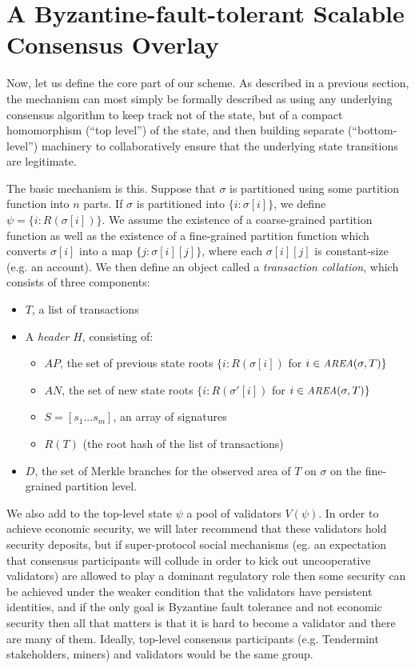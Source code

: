 \documentclass[11pt,a4paper]{article}
\makeatletter
\theoremstyle{plain}
\theoremstyle{definition}
\theoremstyle{remark}
\newcommand{\eg}{e.g.\@\xspace}
\newcommand{\makeintoafunction}[1]{\textit{\uppercase{\small #1}}}
\newcommand{\AREA}{\makeintoafunction{area}}
\makeatother
\begin{document}
\section{A Byzantine-fault-tolerant Scalable Consensus Overlay}

Now, let us define the core part of our scheme. As described in a previous section, the mechanism can most simply be formally described as using any underlying consensus algorithm to keep track not of the state, but of a compact homomorphism (``top level'') of the state, and then building separate (``bottom-level'') machinery to collaboratively ensure that the underlying state transitions are legitimate.

The basic mechanism is this. Suppose that $\sigma$ is partitioned using some partition function into $n$ parts. If $\sigma$ is partitioned into $\{i: \sigma[i]\}$, we define $\psi = \{i: R(\sigma[i])\}$. We assume the existence of a coarse-grained partition function as well as the existence of a fine-grained partition function which converts $\sigma[i]$ into a map $\{j: \sigma[i][j]\}$, where each $\sigma[i][j]$ is constant-size (\eg an account). We then define an object called a \emph{transaction collation}, which consists of three components:

\begin{itemize}
\item
$T$, a list of transactions
\item
A \emph{header} $H$, consisting of:
    \begin{itemize}
    \item
    $AP$, the set of previous state roots $\{i: R(\sigma[i])$ for $i \in \AREA(\sigma, T)\}$
    \item
    $AN$, the set of new state roots $\{i: R(\sigma'[i])$ for $i \in \AREA(\sigma, T)\}$
    \item
    $S = [s_1 ... s_m]$, an array of signatures
    \item
    $R(T)$ (the root hash of the list of transactions)
    \end{itemize}
\item
$D$, the set of Merkle branches for the observed area of $T$ on $\sigma$ on the fine-grained partition level.
\end{itemize}

We also add to the top-level state $\psi$ a pool of validators $V(\psi)$. In order to achieve economic security, we will later recommend that these validators hold security deposits, but if super-protocol social mechanisms (eg. an expectation that consensus participants will collude in order to kick out uncooperative validators) are allowed to play a dominant regulatory role then some security can be achieved under the weaker condition that the validators have persistent identities, and if the only goal is Byzantine fault tolerance and not economic security then all that matters is that it is hard to become a validator and there are many of them. Ideally, top-level consensus participants (\eg Tendermint stakeholders, miners) and validators would be the same group.
\end{document}

